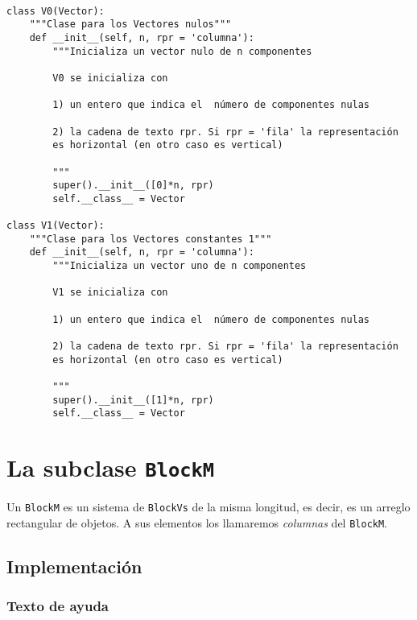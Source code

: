 \documentclass[11pt]{report}
\begin{document}
\begin{verbatim}

class V0(Vector):
    """Clase para los Vectores nulos"""
    def __init__(self, n, rpr = 'columna'):
        """Inicializa un vector nulo de n componentes

        V0 se inicializa con

        1) un entero que indica el  número de componentes nulas
    
        2) la cadena de texto rpr. Si rpr = 'fila' la representación
        es horizontal (en otro caso es vertical)

        """
        super().__init__([0]*n, rpr)
        self.__class__ = Vector

class V1(Vector):
    """Clase para los Vectores constantes 1"""
    def __init__(self, n, rpr = 'columna'):
        """Inicializa un vector uno de n componentes

        V1 se inicializa con

        1) un entero que indica el  número de componentes nulas
    
        2) la cadena de texto rpr. Si rpr = 'fila' la representación
        es horizontal (en otro caso es vertical)

        """
        super().__init__([1]*n, rpr)
        self.__class__ = Vector

\end{verbatim}


\chapter{La subclase \texttt{BlockM}}
\label{sec:orged0ca16}

Un \texttt{BlockM} es un sistema de \texttt{BlockVs} de la misma longitud, es decir,
es un arreglo rectangular de objetos. A sus elementos los llamaremos
\emph{columnas} del \texttt{BlockM}.

\section{Implementación}
\label{sec:orgbb42f32}
\subsection{Texto de ayuda}
\label{sec:org9412f63}
\end{document}
